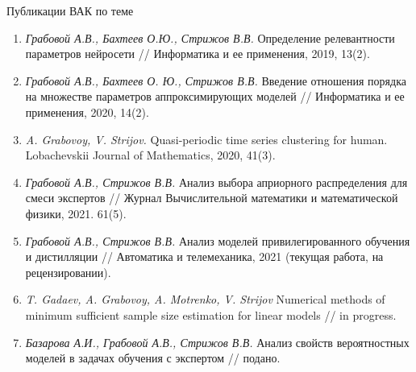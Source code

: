 \documentclass[10pt,pdf,hyperref={unicode}]{beamer}
\begin{document}
\begin{frame}{Публикации ВАК по теме}
\justifying
\begin{enumerate}
\item \textit{Грабовой А.В., Бахтеев О.Ю., Стрижов В.В.} Определение релевантности параметров нейросети // Информатика и ее применения, 2019, 13(2).
\item \textit{Грабовой А.В., Бахтеев О. Ю., Стрижов В.В.} Введение отношения порядка на множестве параметров аппроксимирующих моделей // Информатика и ее применения, 2020, 14(2).
\item \textit{A. Grabovoy, V. Strijov.} Quasi-periodic time series clustering for human. Lobachevskii Journal of Mathematics, 2020, 41(3).
\item \textit{Грабовой А.В., Стрижов В.В.} Анализ выбора априорного распределения для смеси экспертов // Журнал Вычислительной математики и математической физики, 2021. 61(5).
\item \textit{Грабовой А.В., Стрижов В.В.} Анализ моделей привилегированного обучения и дистилляции // Автоматика и телемеханика, 2021 (текущая работа, на рецензировании).
\item \textit{T. Gadaev, A. Grabovoy, A. Motrenko, V. Strijov} Numerical methods of minimum sufficient sample size estimation for linear models // in progress.
\item \textit{Базарова А.И., Грабовой А.В., Стрижов В.В.} Анализ свойств вероятностных моделей в задачах обучения с экспертом // подано.
\end{enumerate}

\end{frame}
\end{document}
